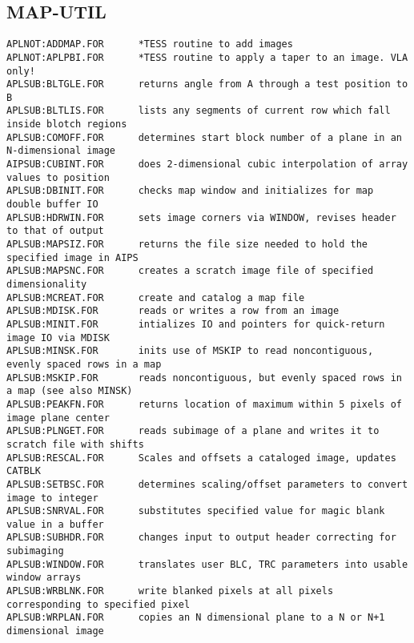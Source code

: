 \subsection{MAP-UTIL}
\begin{verbatim}
APLNOT:ADDMAP.FOR      *TESS routine to add images
APLNOT:APLPBI.FOR      *TESS routine to apply a taper to an image. VLA only!
APLSUB:BLTGLE.FOR      returns angle from A through a test position to B
APLSUB:BLTLIS.FOR      lists any segments of current row which fall inside blotch regions
APLSUB:COMOFF.FOR      determines start block number of a plane in an N-dimensional image
AIPSUB:CUBINT.FOR      does 2-dimensional cubic interpolation of array values to position
APLSUB:DBINIT.FOR      checks map window and initializes for map double buffer IO
APLSUB:HDRWIN.FOR      sets image corners via WINDOW, revises header to that of output
APLSUB:MAPSIZ.FOR      returns the file size needed to hold the specified image in AIPS
APLSUB:MAPSNC.FOR      creates a scratch image file of specified dimensionality
APLSUB:MCREAT.FOR      create and catalog a map file
APLSUB:MDISK.FOR       reads or writes a row from an image
APLSUB:MINIT.FOR       intializes IO and pointers for quick-return image IO via MDISK
APLSUB:MINSK.FOR       inits use of MSKIP to read noncontiguous, evenly spaced rows in a map
APLSUB:MSKIP.FOR       reads noncontiguous, but evenly spaced rows in a map (see also MINSK)
APLSUB:PEAKFN.FOR      returns location of maximum within 5 pixels of image plane center
APLSUB:PLNGET.FOR      reads subimage of a plane and writes it to scratch file with shifts
APLSUB:RESCAL.FOR      Scales and offsets a cataloged image, updates CATBLK
APLSUB:SETBSC.FOR      determines scaling/offset parameters to convert image to integer
APLSUB:SNRVAL.FOR      substitutes specified value for magic blank value in a buffer
APLSUB:SUBHDR.FOR      changes input to output header correcting for subimaging
APLSUB:WINDOW.FOR      translates user BLC, TRC parameters into usable window arrays
APLSUB:WRBLNK.FOR      write blanked pixels at all pixels corresponding to specified pixel
APLSUB:WRPLAN.FOR      copies an N dimensional plane to a N or N+1 dimensional image
\end{verbatim}
 
